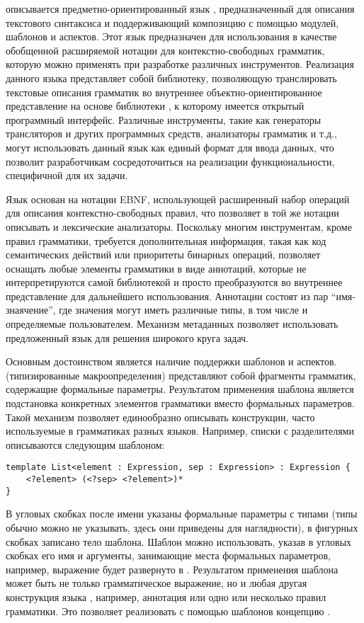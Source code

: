  описывается предметно-ориентированный язык \GRM{}, предназначенный для описания текстового синтаксиса и поддерживающий композицию с помощью модулей, шаблонов и аспектов. 
Этот язык предназначен для использования в качестве обобщенной
расширяемой нотации для контекстно-свободных грамматик, которую можно применять при разработке различных инструментов. Реализация данного языка представляет собой библиотеку, позволяющую транслировать текстовые описания грамматик во внутреннее объектно-ориентированное представление на основе библиотеки , к которому имеется открытый программный интерфейс. 
Различные инструменты, такие как генераторы трансляторов и других программных средств, анализаторы грамматик и т.д., могут использовать данный язык как единый формат для ввода данных, что позволит разработчикам сосредоточиться на реализации функциональности, специфичной для их задачи. 

Язык \GRM{} основан на нотации EBNF, использующей расширенный набор операций для описания контекстно-свободных правил, что позволяет в той же нотации описывать и лексические анализаторы. Поскольку многим инструментам, кроме правил грамматики, требуется дополнительная информация, такая как код семантических действий или приоритеты бинарных операций, \GRM{} позволяет оснащать любые элементы грамматики  в виде аннотаций, которые не интерпретируются самой библиотекой и просто преобразуются во внутреннее представление для дальнейшего использования. Аннотации состоят из пар ``имя-знаячение'', где значения могут иметь различные типы, в том числе и определяемые пользователем. Механизм метаданных позволяет использовать предложенный язык для решения широкого круга задач.

Основным достоинством \GRM{} является наличие поддержки шаблонов и аспектов.
 (типизированные макроопределения) представляют собой фрагменты грамматик, содержащие формальные параметры. Результатом применения шаблона является подстановка конкретных элементов грамматики вместо формальных параметров. Такой механизм позволяет единообразно описывать конструкции, часто используемые в грамматиках разных языков. Например, списки с разделителями описываются следующим шаблоном:
\begin{lstlisting}
template List<element : Expression, sep : Expression> : Expression {
	<?element> (<?sep> <?element>)*
}
\end{lstlisting}
В угловых скобках после имени  указаны формальные параметры с типами (типы обычно можно не указывать, здесь они приведены для наглядности), в фигурных скобках записано тело шаблона. 
Шаблон можно использовать, указав в угловых скобках его имя и аргументы, занимающие места формальных параметров, например, выражение  будет развернуто в . Результатом применения шаблона может быть не только грамматическое выражение, но и любая другая конструкция языка \GRM{}, например, аннотация или одно или несколько правил грамматики. Это позволяет реализовать с помощью шаблонов концепцию . 

